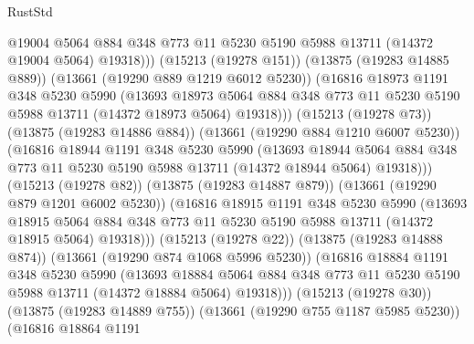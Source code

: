 \begin{lexlean}{RustStd}
\begin{coremodule}
                    @19004
                    @5064
                    @884
                    @348
                    @773
                    @11
                    @5230
                    @5190
                    @5988
                    @13711
                    (@14372 @19004 @5064)
                    @19318)))
              (@15213 (@19278 @151))
              (@13875 (@19283 @14885 @889))
              (@13661 (@19290 @889 @1219 @6012 @5230))
              (@16816
                @18973
                @1191
                @348
                @5230
                @5990
                (@13693
                  @18973
                  @5064
                  @884
                  @348
                  @773
                  @11
                  @5230
                  @5190
                  @5988
                  @13711
                  (@14372 @18973 @5064)
                  @19318)))
            (@15213 (@19278 @73))
            (@13875 (@19283 @14886 @884))
            (@13661 (@19290 @884 @1210 @6007 @5230))
            (@16816
              @18944
              @1191
              @348
              @5230
              @5990
              (@13693
                @18944
                @5064
                @884
                @348
                @773
                @11
                @5230
                @5190
                @5988
                @13711
                (@14372 @18944 @5064)
                @19318)))
          (@15213 (@19278 @82))
          (@13875 (@19283 @14887 @879))
          (@13661 (@19290 @879 @1201 @6002 @5230))
          (@16816
            @18915
            @1191
            @348
            @5230
            @5990
            (@13693
              @18915
              @5064
              @884
              @348
              @773
              @11
              @5230
              @5190
              @5988
              @13711
              (@14372 @18915 @5064)
              @19318)))
        (@15213 (@19278 @22))
        (@13875 (@19283 @14888 @874))
        (@13661 (@19290 @874 @1068 @5996 @5230))
        (@16816
          @18884
          @1191
          @348
          @5230
          @5990
          (@13693
            @18884
            @5064
            @884
            @348
            @773
            @11
            @5230
            @5190
            @5988
            @13711
            (@14372 @18884 @5064)
            @19318)))
      (@15213 (@19278 @30))
      (@13875 (@19283 @14889 @755))
      (@13661 (@19290 @755 @1187 @5985 @5230))
      (@16816
        @18864
        @1191

\end{coremodule}
\end{lexlean}
